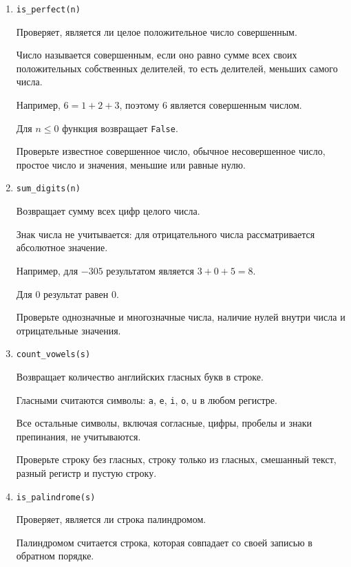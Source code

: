 \begin{enumerate}
Функция возвращает \texttt{True}, если выполнены все три условия,
и \texttt{False} в противном случае.

Проверьте корректный пароль, а также случаи нарушения каждого требования
по отдельности и нескольких требований одновременно.

\item \texttt{is\_perfect(n)}

Проверяет, является ли целое положительное число совершенным.

Число называется совершенным, если оно равно сумме всех своих
положительных собственных делителей, то есть делителей, меньших самого
числа.

Например, $6=1+2+3$, поэтому 6 является совершенным числом.

Для $n\leq0$ функция возвращает \texttt{False}.

Проверьте известное совершенное число, обычное несовершенное число,
простое число и значения, меньшие или равные нулю.

\item \texttt{sum\_digits(n)}

Возвращает сумму всех цифр целого числа.

Знак числа не учитывается: для отрицательного числа рассматривается
абсолютное значение.

Например, для $-305$ результатом является $3+0+5=8$.

Для $0$ результат равен $0$.

Проверьте однозначные и многозначные числа, наличие нулей внутри числа
и отрицательные значения.

\item \texttt{count\_vowels(s)}

Возвращает количество английских гласных букв в строке.

Гласными считаются символы:
\texttt{a}, \texttt{e}, \texttt{i}, \texttt{o}, \texttt{u}
в любом регистре.

Все остальные символы, включая согласные, цифры, пробелы и знаки
препинания, не учитываются.

Проверьте строку без гласных, строку только из гласных, смешанный текст,
разный регистр и пустую строку.

\item \texttt{is\_palindrome(s)}

Проверяет, является ли строка палиндромом.

Палиндромом считается строка, которая совпадает со своей записью
в обратном порядке.


\end{enumerate}
